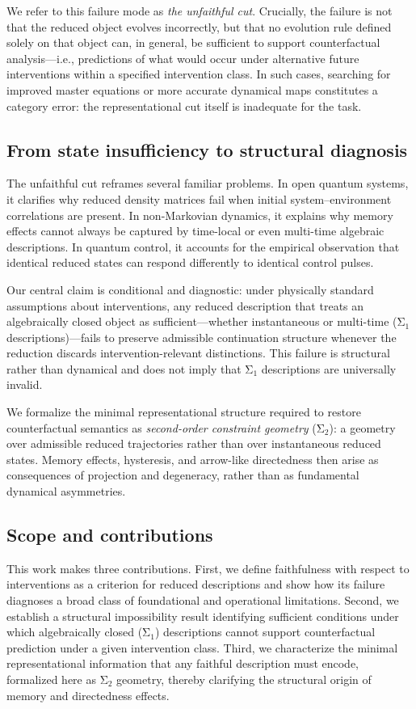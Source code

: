 We refer to this failure mode as \emph{the unfaithful cut}. Crucially, the failure is not that the reduced object evolves incorrectly, but that no evolution rule defined solely on that object can, in general, be sufficient to support counterfactual analysis—i.e., predictions of what would occur under alternative future interventions within a specified intervention class. In such cases, searching for improved master equations or more accurate dynamical maps constitutes a category error: the representational cut itself is inadequate for the task.

\subsection{From state insufficiency to structural diagnosis}

The unfaithful cut reframes several familiar problems. In open quantum systems, it clarifies why reduced density matrices fail when initial system--environment correlations are present. In non-Markovian dynamics, it explains why memory effects cannot always be captured by time-local or even multi-time algebraic descriptions. In quantum control, it accounts for the empirical observation that identical reduced states can respond differently to identical control pulses.

Our central claim is conditional and diagnostic: under physically standard assumptions about interventions, any reduced description that treats an algebraically closed object as sufficient—whether instantaneous or multi-time (Σ$_1$ descriptions)—fails to preserve admissible continuation structure whenever the reduction discards intervention-relevant distinctions. This failure is structural rather than dynamical and does not imply that Σ$_1$ descriptions are universally invalid.

We formalize the minimal representational structure required to restore counterfactual semantics as \emph{second-order constraint geometry} (Σ$_2$): a geometry over admissible reduced trajectories rather than over instantaneous reduced states. Memory effects, hysteresis, and arrow-like directedness then arise as consequences of projection and degeneracy, rather than as fundamental dynamical asymmetries.

\subsection{Scope and contributions}

This work makes three contributions. First, we define faithfulness with respect to interventions as a criterion for reduced descriptions and show how its failure diagnoses a broad class of foundational and operational limitations. Second, we establish a structural impossibility result identifying sufficient conditions under which algebraically closed (Σ$_1$) descriptions cannot support counterfactual prediction under a given intervention class. Third, we characterize the minimal representational information that any faithful description must encode, formalized here as Σ$_2$ geometry, thereby clarifying the structural origin of memory and directedness effects.

